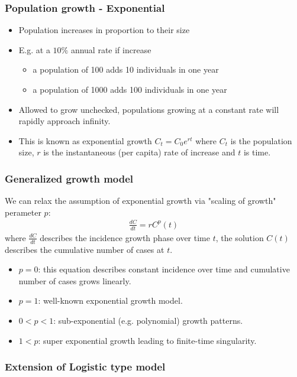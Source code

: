 \subsubsection{Population growth - Exponential}

\begin{itemize}
    \item Population increases in proportion to their size
    \item E.g. at a $10 \%$ annual rate if increase
        \begin{itemize}
            \item a population of 100 adds 10 individuals in one year
            \item a population of 1000 adds 100 individuals in one year
        \end{itemize}
    \item Allowed to grow unchecked, populations growing at a constant
        rate will rapidly approach infinity.
    \item This is known as exponential growth $C_t = C_0 e^{r t}$ where $C_t$
        is the population size, $r$ is the instantaneous (per capita) rate of
        increase and $t$ is time.
\end{itemize}

\subsubsection{Generalized growth model}

We can relax the assumption of exponential growth via "scaling of growth"
perameter $p$:
\begin{align*}
    \frac{dC}{dt} = r C^p (t)
\end{align*}
where $\frac{dC}{dt}$ describes the incidence growth phase over time $t$, the
solution $C(t)$ describes the cumulative number of cases at $t$.
\begin{itemize}
    \item $p=0$: this equation describes constant incidence over time and
        cumulative number of cases grows linearly.
    \item $p=1$: well-known exponential growth model.
    \item $0<p<1$: sub-exponential (e.g. polynomial) growth patterns.
    \item $1<p$: super exponential growth leading to finite-time singularity.
\end{itemize}

\subsubsection{Extension of Logistic type model}

